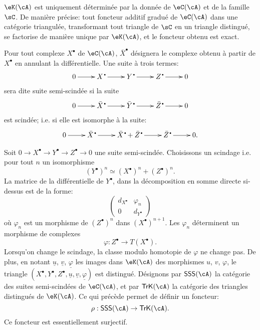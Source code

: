 \subsubsection{}\label{VIII:1-2-4}

$\eK(\cA)$ est uniquement d\'etermin\'ee par la donn\'ee de $\eC(\cA)$ et de la 
famille $\sC$. De mani\`ere pr\'ecise: tout foncteur additif gradu\'e de 
$\eC(\cA)$ dans une cat\'egorie triangul\'ee, transformant tout triangle de 
$\sC$ en un triangle distingu\'e, se factorise de mani\`ere unique par 
$\eK(\cA)$, et le foncteur obtenu est exact. 

Pour tout complexe $X^\bullet$ de $\eC(\cA)$, $\bar X^\bullet$ d\'esignera le 
complexe obtenu \`a partir de $X^\bullet$ en annulant la diff\'erentielle. Une 
suite \`a trois termes: 
\[\xymatrix{
  0 \ar[r] 
    & X^\bullet \ar[r] 
    & Y^\bullet \ar[r] 
    & Z^\bullet \ar[r] 
    & 0 
}\]
sera dite suite semi-scind\'ee si la suite 
\[\xymatrix{
  0 \ar[r] 
    & \bar X^\bullet \ar[r] 
    & \bar Y^\bullet \ar[r] 
    & \bar Z^\bullet \ar[r] 
    & 0 
}\]
est scind\'ee; i.e. si elle est isomorphe \`a la suite: 
\[\xymatrix{
  0 \ar[r] 
    & \bar X^\bullet \ar[r] 
    & \bar X^\bullet + \bar Z^\bullet \ar[r] 
    & \bar Z^\bullet \ar[r] 
    & 0 \text{.}
}\]

Soit $0 \to X^\bullet \to Y^\bullet \to Z^\bullet \to 0$ une suite 
semi-scind\'ee. Choisissons un scindage i.e. pour tout $n$ un isomorphisme 
\[
  (Y^\bullet)^n \simeq (X^\bullet)^n + (Z^\bullet)^n \text{.}
\]
La matrice de la diff\'erentielle de $Y^\bullet$, dans la d\'ecomposition en 
somme directe si-dessus est de la forme: 
\[
  \begin{pmatrix}
    d_{X^\bullet} & \varphi_n \\
    0 & d_{Y^\bullet} 
  \end{pmatrix}
\]
o\`u $\varphi_n$ est un morphisme de $(Z^\bullet)^n$ dans 
$(X^\bullet)^{n+1}$. Les $\varphi_n$ d\'eterminent un morphisme de complexes 
\[
  \varphi:Z^\bullet \to T(X^\bullet) \text{.}
\]
Lorsqu'on change le scindage, la classe modulo homotopie de $\varphi$ ne 
change pas. De plus, en notant $\underline u$, $\underline v$, 
$\underline\varphi$ les images dans $\eK(\cA)$ des morphismes $u$, $v$, 
$\varphi$, le triangle 
$(X^\bullet,Y^\bullet,Z^\bullet,\underline u,\underline v,\underline\varphi)$ 
est distingu\'e. D\'esignons par $\mathsf{SSS}(\cA)$ la cat\'egorie des 
suites semi-scind\'ees de $\eC(\cA)$, et par $\mathsf{TrK}(\cA)$ la 
cat\'egorie des triangles distingu\'es de $\eK(\cA)$. Ce qui pr\'ec\`ede 
permet de d\'efinir un foncteur: 
\[
  \rho:\mathsf{SSS}(\cA) \to \mathsf{TrK}(\cA) \text{.}
\]
Ce foncteur est essentiellement surjectif. 










